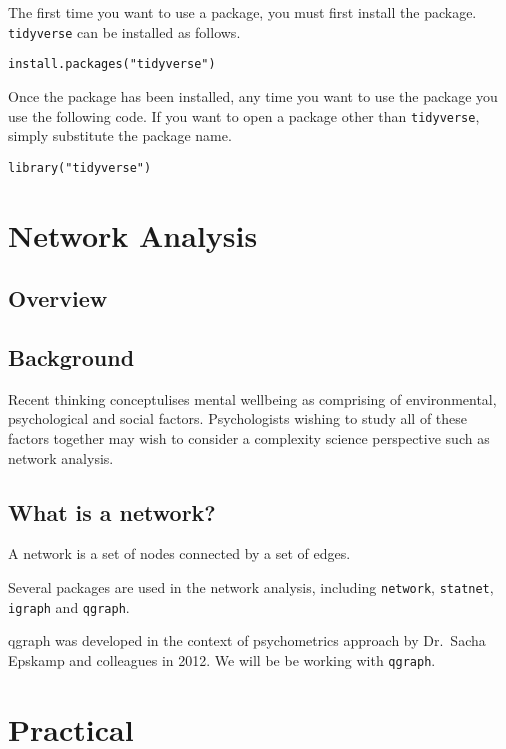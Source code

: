 \documentclass[]{book}
\begin{document}
The first time you want to use a package, you must first install the
package. \texttt{tidyverse} can be installed as follows.

\begin{verbatim}
install.packages("tidyverse")
\end{verbatim}

Once the package has been installed, any time you want to use the
package you use the following code. If you want to open a package other
than \texttt{tidyverse}, simply substitute the package name.

\begin{verbatim}
library("tidyverse")
\end{verbatim}

\chapter{Network Analysis}\label{network-analysis}

\section{Overview}\label{overview-3}

\section{Background}\label{background}

Recent thinking conceptulises mental wellbeing as comprising of
environmental, psychological and social factors. Psychologists wishing
to study all of these factors together may wish to consider a complexity
science perspective such as network analysis.

\section{What is a network?}\label{what-is-a-network}

A network is a set of nodes connected by a set of edges.

Several packages are used in the network analysis, including
\texttt{network}, \texttt{statnet}, \texttt{igraph} and \texttt{qgraph}.

qgraph was developed in the context of psychometrics approach by
Dr.~Sacha Epskamp and colleagues in 2012. We will be be working with
\texttt{qgraph}.

\chapter{Practical}\label{practical}
\end{document}
